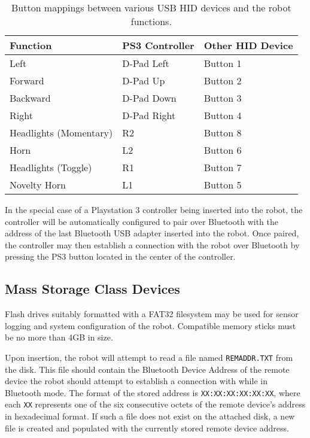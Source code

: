 \begin{table}[H]
	\begin{center}
		\begin{tabular}{ | l | l | l |}
			\hline
			\textbf{Function}		& \textbf{PS3 Controller}	& \textbf{Other HID Device} \\ \hline

			Left					& D-Pad Left				& Button 1	\\ \hline
			Forward					& D-Pad Up					& Button 2	\\ \hline
			Backward				& D-Pad Down				& Button 3	\\ \hline
			Right					& D-Pad Right				& Button 4	\\ \hline
			Headlights (Momentary)	& R2						& Button 8	\\ \hline
			Horn					& L2						& Button 6	\\ \hline
			Headlights (Toggle)		& R1						& Button 7	\\ \hline
			Novelty Horn			& L1						& Button 5	\\ \hline

		\end{tabular}
		\caption[USB HID Robot Button Mappings]{Button mappings between various USB HID devices and the robot functions.}
		\label{tab:robotbuttonmappings}
	\end{center}
\end{table}

In the special case of a Playstation 3 controller being inserted into the robot, the controller will be automatically configured to pair over Bluetooth with the address of the last Bluetooth USB adapter inserted into the robot. Once paired, the controller may then establish a connection with the robot over Bluetooth by pressing the PS3 button located in the center of the controller.

\subsection{Mass Storage Class Devices}

Flash drives suitably formatted with a FAT32 filesystem may be used for sensor logging and system configuration of the robot. Compatible memory sticks must be no more than 4GB in size.

Upon insertion, the robot will attempt to read a file named \texttt{REMADDR.TXT} from the disk. This file should contain the Bluetooth Device Address of the remote device the robot should attempt to establish a connection with while in Bluetooth mode. The format of the stored address is \texttt{XX:XX:XX:XX:XX:XX}, where each \texttt{XX} represents one of the six consecutive octets of the remote device's address in hexadecimal format. If such a file does not exist on the attached disk, a new file is created and populated with the currently stored remote device address.

